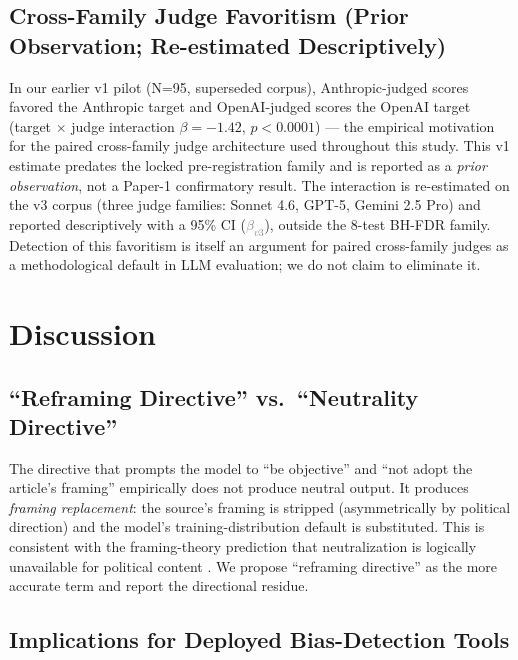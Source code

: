 \documentclass{article}
\newcommand{\pred}[1]{\textcolor{gray}{\textit{#1}}}
\begin{document}
\subsection{Cross-Family Judge Favoritism (Prior Observation; Re-estimated Descriptively)}

In our earlier v1 pilot (N=95, superseded corpus), Anthropic-judged scores favored the Anthropic target and OpenAI-judged scores the OpenAI target (target $\times$ judge interaction $\beta = -1.42$, $p < 0.0001$) — the empirical motivation for the paired cross-family judge architecture used throughout this study. This v1 estimate predates the locked pre-registration family and is reported as a \emph{prior observation}, not a Paper-1 confirmatory result. The interaction is re-estimated on the v3 corpus (three judge families: Sonnet 4.6, GPT-5, Gemini 2.5 Pro) and reported descriptively with a 95\% CI (\pred{$\beta_{v3}$}), outside the 8-test BH-FDR family. Detection of this favoritism is itself an argument for paired cross-family judges as a methodological default in LLM evaluation; we do not claim to eliminate it.

\section{Discussion}

\subsection{``Reframing Directive'' vs.\ ``Neutrality Directive''}

The directive that prompts the model to ``be objective'' and ``not adopt the article's framing'' empirically does not produce neutral output. It produces \emph{framing replacement}: the source's framing is stripped (asymmetrically by political direction) and the model's training-distribution default is substituted. This is consistent with the framing-theory prediction that neutralization is logically unavailable for political content \citep{lakoff1996, entman1993}. We propose ``reframing directive'' as the more accurate term and report the directional residue.

\subsection{Implications for Deployed Bias-Detection Tools}
\end{document}
